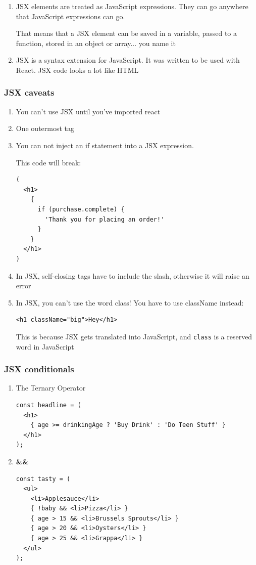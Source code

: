 \documentclass[a4paper, 12pt]{article}
\begin{document}
\begin{enumerate}
\item JSX elements are treated as JavaScript expressions. They can go anywhere that JavaScript expressions can go.

That means that a JSX element can be saved in a variable, passed to a function, stored in an object or array... you name it

\item JSX is a syntax extension for JavaScript. It was written to be used with React. JSX code looks a lot like HTML
\end{enumerate}

\subsubsection{JSX caveats}
\begin{enumerate}

\item You can't use JSX until you've imported react

\item One outermost tag

\item You can not inject an if statement into a JSX expression.

This code will break:
\begin{verbatim}
(
  <h1>
    {
      if (purchase.complete) {
        'Thank you for placing an order!'
      }
    }
  </h1>
)
\end{verbatim}

\item In JSX, self-closing tags have to include the slash, otherwise it will raise an error

\item In JSX, you can't use the word class! You have to use className instead:
\begin{verbatim}
<h1 className="big">Hey</h1>
\end{verbatim}
This is because JSX gets translated into JavaScript, and \verb|class| is a reserved word in JavaScript

\end{enumerate}

\subsubsection{JSX conditionals}
\begin{enumerate}
\item The Ternary Operator
\begin{verbatim}
const headline = (
  <h1>
    { age >= drinkingAge ? 'Buy Drink' : 'Do Teen Stuff' }
  </h1>
);
\end{verbatim}
\item \textbf{\&\&}
\begin{verbatim}
const tasty = (
  <ul>
    <li>Applesauce</li>
    { !baby && <li>Pizza</li> }
    { age > 15 && <li>Brussels Sprouts</li> }
    { age > 20 && <li>Oysters</li> }
    { age > 25 && <li>Grappa</li> }
  </ul>
);
\end{verbatim}
\end{enumerate}
\end{document}

